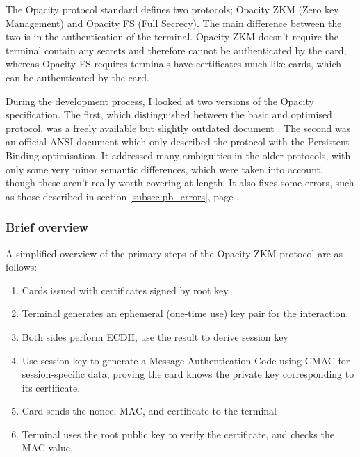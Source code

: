 \documentclass[12pt,a4paper]{article}
\begin{document}
The Opacity protocol standard defines two protocols; Opacity ZKM (Zero key Management) and Opacity FS (Full Secrecy). The main difference between the two is in the authentication of the terminal. Opacity ZKM doesn't require the terminal contain any secrets and therefore cannot be authenticated by the card, whereas Opacity FS requires terminals have certificates much like cards, which can be authenticated by the card.

During the development process, I looked at two versions of the Opacity specification. The first, which distinguished between the basic and optimised protocol, was a freely available but slightly outdated document \cite{opacityfree}. The second was an official ANSI document \cite{opacity} which only described the protocol with the Persistent Binding  optimisation. It addressed many ambiguities in the older protocols, with only some very minor semantic differences, which were taken into account, though these aren't really worth covering at length. It also fixes some errors, such as those described in section \ref{subsec:pb_errors}, page \pageref{subsec:pb_errors}.

\subsubsection{Brief overview}
A simplified overview of the primary steps of the Opacity ZKM protocol are as follows:

\begin{enumerate}
	\item Cards issued with certificates signed by root key
	\item Terminal generates an ephemeral (one-time use) key pair for the interaction.
	\item Both sides perform ECDH, use the result to derive session key
	\item Use session key to generate a Message Authentication Code using CMAC for session-specific data, proving the card knows the private key corresponding to its certificate.
	\item Card sends the nonce, MAC, and certificate to the terminal
	\item Terminal uses the root public key to verify the certificate, and checks the MAC value.
\end{enumerate}

\end{document}
